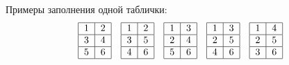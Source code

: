 \documentclass[]{article}
\begin{document}
\begin{itemize}
	Примеры заполнения одной таблички:
	$$
\begin{tabular}{ |l|l|l|l| }
\hline
1 & 2 \\ \hline
3 & 4 \\ \hline
5 & 6 \\
\hline
\end{tabular}
	\quad	
\begin{tabular}{ |l|l|l|l| }
\hline
1&2 \\ \hline
3&5 \\ \hline
4&6 \\
\hline
\end{tabular}
	\quad	
\begin{tabular}{ |l|l|l|l| }
\hline
1&3 \\ \hline
2&4 \\ \hline
5&6 \\
\hline
\end{tabular}
	\quad	
\begin{tabular}{ |l|l|l|l| }
\hline
1&3 \\ \hline
2&5 \\ \hline
4&6 \\
\hline
\end{tabular}
	\quad	
\begin{tabular}{ |l|l|l|l| }
\hline
1&4 \\ \hline
2&5 \\ \hline
3&6 \\
\hline
\end{tabular}
	$$
\end{itemize}
\end{document}
